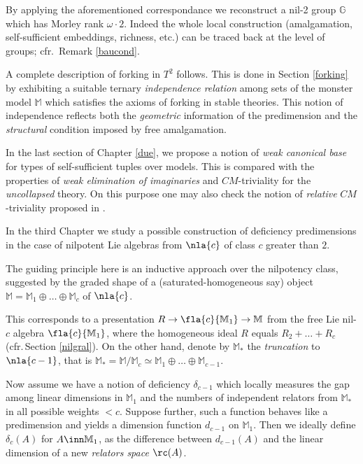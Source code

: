 By applying the aforementioned correspondance
we reconstruct a nil-2 group $\mathbb{G}$ which has Morley rank $\omega\cdot2$. Indeed the whole local construction (amalgamation,
self-sufficient embeddings, richness, etc.)
can be traced back at the level of groups; cfr.~Remark \ref{baucond}.

\smallskip
A complete description of forking in $T^{2}$ follows. This is done in Section \ref{forking} by exhibiting a suitable ternary
{\em independence relation} among sets of the monster model $\mathbb{M}$ which satisfies the
axioms of forking in stable theories. This notion of independence reflects both the {\em geometric} information of
the predimension and the {\em structural} condition imposed by free amalgamation.

\smallskip
In the last section of Chapter \ref{due}, we propose a notion of {\em weak canonical base} for
types of self-sufficient tuples over models.
This is compared with the properties of {\em weak elimination of imaginaries} and $CM$-triviality
for the {\em uncollapsed} theory. On this purpose one may also check the notion
of {\em relative} $CM$-triviality proposed in \cite{cmtr}.

\bigskip
In the third Chapter we study a possible construction of deficiency predimensions in the case of nilpotent
Lie algebras from $\nla{c}$ of class $c$ greater than $2$.

The guiding principle here is an inductive approach\label{indunil} over the nilpotency class, suggested by the graded shape of
a (saturated-homogeneous say) object $\mathbb{M}=\mathbb{M}_{1}\oplus\dots\oplus\mathbb{M}_{c}$ of $\nla{c}$.

This corresponds to a presentation $R\to\fla{c}{\mathbb{M}_{1}}\to \mathbb{M}$ from the free Lie nil-$c$ algebra
$\fla{c}{\mathbb{M}_{1}}$, where the homogeneous ideal $R$ equals $R_{2}+\dots+R_{c}$ (cfr.\,Section \ref{nilgral}).
On the other hand, denote by $\mathbb{M}_{*}$ the {\em truncation}
to $\nla{c-1}$, that is $\mathbb{M}_{*}=\mathbb{M}/\mathbb{M}_{c}\simeq\mathbb{M}_{1}\oplus\dots\oplus\mathbb{M}_{c-1}$.

Now assume we have a notion of deficiency $\delta_{c-1}$
which locally measures the gap among linear dimensions in $\mathbb{M}_{1}$
and the numbers of independent relators from $\mathbb{M}_{*}$ in all possible weights $<c$.
Suppose further, such a function behaves like a predimension and yields a dimension function $d_{c-1}$ on $\mathbb{M}_{1}$.
Then we ideally define $\delta_{c}(A)$ for $A\inn \mathbb{M}_{1}$, as the difference between $d_{c-1}(A)$
and the linear dimension of a new {\em relators space} $\rc(A)$.

